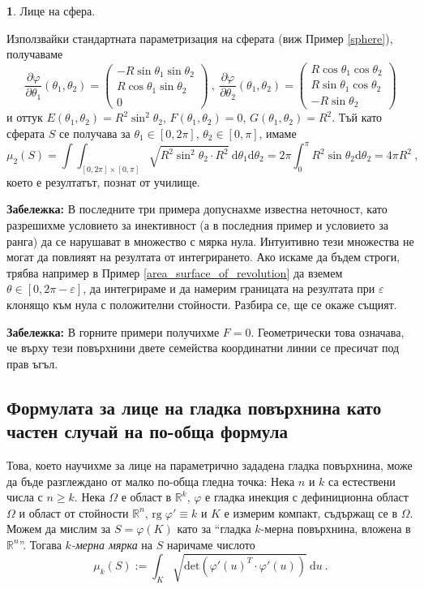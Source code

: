 \documentclass[11pt]{article}
\numberwithin{equation}{section}
\numberwithin{figure}{section}
\numberwithin{table}{section}
\theoremstyle{plain}
\theoremstyle{definition}
\theoremstyle{remark}
\theoremstyle{definition}
\theoremstyle{remark}
\theoremstyle{plain}
\theoremstyle{definition}
\theoremstyle{definition}
\newtheorem{example}[thm]{\protect\examplename}
\theoremstyle{plain}
\theoremstyle{plain}
\theoremstyle{plain}
\theoremstyle{definition}
\theoremstyle{plain}
\providecommand{\examplename}{Пример}
\newcommand*{\R}{\mathbb{R}}
\begin{document}
\begin{example} Лице на сфера.

Използвайки стандартната параметризация на сферата (виж Пример \ref{sphere}), получаваме
$$\frac{\partial\varphi}{\partial \theta_1}(\theta_1,\theta_2)=\left( \begin{array}{c}-R\sin\theta_1 \sin\theta_2 \\ R\cos\theta_1 \sin\theta_2\\ 0\end{array}\right) \ , \ \frac{\partial\varphi}{\partial \theta_2}(\theta_1,\theta_2)=\left( \begin{array}{c}R\cos\theta_1 \cos\theta_2 \\ R\sin\theta_1 \cos\theta_2\\ -R\sin\theta_2\end{array}\right)$$
и оттук $E(\theta_1,\theta_2)=R^2 \sin^2 \theta_2$, $F(\theta_1,\theta_2)=0$, $G(\theta_1,\theta_2)=R^2$.
Тъй като сферата $S$ се получава за $\theta_1\in [0,2\pi]$, $\theta_2\in [0,\pi]$, имаме
$$\mu_2(S)= \int\int_{[0,2\pi]\times [0,\pi]} \sqrt{R^2 \sin^2 \theta_2 \cdot R^2} \ \textrm{d}\theta_1\textrm{d}\theta_2 = 2\pi \int_0^\pi R^2\sin \theta_2\textrm{d}\theta_2 = 4\pi R^2\ ,$$
което е резултатът, познат от училище.
\end{example}

\textbf{Забележка:} В последните три примера допуснахме известна неточност, като разрешихме условието за инективност (а в последния пример и условието за ранга) да се нарушават в множество с мярка нула. Интуитивно тези множества не могат да повлияят на резултата от интегрирането. Ако искаме да бъдем строги, трябва например в Пример \ref{area_surface_of_revolution} да вземем $\theta\in [0,2\pi -\varepsilon]$, да интегрираме и да намерим границата на резултата при $\varepsilon$ клонящо към нула с положителни стойности. Разбира се, ще се окаже същият.

\bigskip

\textbf{Забележка:} В горните примери получихме $F=0$. Геометрически това означава, че върху тези повърхнини двете семейства координатни линии се пресичат под прав ъгъл.

\subsection{Формулата за лице на гладка повърхнина като частен случай на по-обща формула}

Това, което научихме за лице на параметрично зададена гладка повърхнина, може да бъде разглеждано от малко по-обща гледна точка: Нека $n$ и $k$ са естествени числа с $n\ge k$. Нека $\Omega$ е област в $\R^k$, $\varphi$ е гладка инекция с дефиниционна област $\Omega$ и област от стойности $\R^n$, $\textrm{rg}\; \varphi'\equiv k$ и $K$ е измерим компакт, съдържащ се в $\Omega$. Можем да мислим за $S=\varphi (K)$ като за ``гладка $k$-мерна повърхнина, вложена в $\R^n$''. Тогава \textit{$k$-мерна мярка} на $S$ наричаме числото
$$\mu_k(S):= \int_K \sqrt{\textrm{det} \left( {\varphi'}(u)^T \cdot\varphi'(u)\right)} \ \textrm{d}u \ .$$
\end{document}
